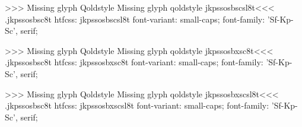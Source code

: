 >>>
Missing glyph	Qoldstyle
Missing glyph	qoldstyle
\<jkpssosbscsl8t\><<<
.jkpssosbsc8t
htfcss:  jkpssosbscsl8t  font-variant: small-caps; font-family: 'Sf-Kp-Sc', serif;

>>>
Missing glyph	Qoldstyle
Missing glyph	qoldstyle
\<jkpssosbxsc8t\><<<
.jkpssosbsc8t
htfcss:  jkpssosbxsc8t  font-variant: small-caps; font-family: 'Sf-Kp-Sc', serif;

>>>
Missing glyph	Qoldstyle
Missing glyph	qoldstyle
\<jkpssosbxscsl8t\><<<
.jkpssosbsc8t
htfcss:  jkpssosbxscsl8t  font-variant: small-caps; font-family: 'Sf-Kp-Sc', serif;

